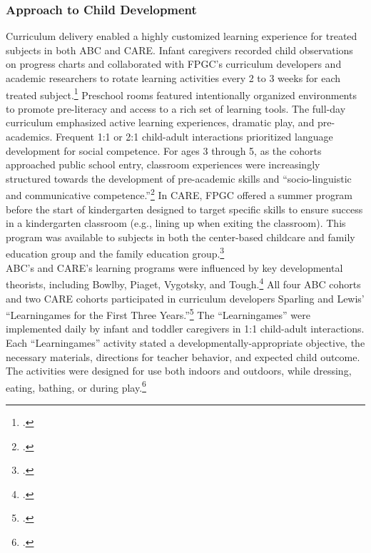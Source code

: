 \begin{appendices}
\subsubsection{Approach to Child Development}
\noindent Curriculum delivery enabled a highly customized learning experience for treated subjects in both ABC and CARE. Infant caregivers recorded child observations on progress charts and collaborated with FPGC's curriculum developers and academic researchers to rotate learning activities every 2 to 3 weeks for each treated subject.\footnote{\citet{Ramey_Collier_etal_1976_CarolinaAbecedarianProject,Campbell_Ramey_1994_CD}.} Preschool rooms featured intentionally organized environments to promote pre-literacy and access to a rich set of learning tools. The full-day curriculum emphasized active learning experiences, dramatic play, and pre-academics. Frequent 1:1 or 2:1 child-adult interactions prioritized language development for social competence. For ages 3 through 5, as the cohorts approached public school entry, classroom experiences were increasingly structured  towards the development of pre-academic skills and ``socio-linguistic and communicative competence.''\footnote{\citet{Ramey-et-al_1977_Intro-to-ABC, Haskins_1985_CD, Ramey_1981_Modification, Ramey_Campbell_1979_SR, Ramey_Smith_1977_AJMD, Ramey_McGinness_etal_1982_Abecedarianapproach, Sparling_Lewis_1979_BOOKLearninggamesFirstThree,Sparling_Lewis_1984_BOOKLearningGamesThreesFours}.} In CARE, FPGC offered a summer program before the start of kindergarten designed to target specific skills to ensure success in a kindergarten classroom (e.g., lining up when exiting the classroom). This program was available to subjects in both the center-based childcare and family education group and the family education group.\footnote{\citet{Ramey_etal_1985_Project-CARE_TiECSE}.} \\

\noindent ABC's and CARE's learning programs were influenced by key developmental theorists, including Bowlby, Piaget, Vygotsky, and Tough.\footnote{\citet{Sparling_1974_Synth_Edu_Infant_SPEECH,Mcginness_1981_Developing,abc2014-2015interviews}.} All four ABC cohorts and two CARE cohorts participated in curriculum developers Sparling and Lewis' ``Learningames for the First Three Years.''\footnote{ \citet{Sparling_Lewis_1979_BOOKLearninggamesFirstThree}.} The ``Learningames'' were implemented daily by infant and toddler caregivers in 1:1 child-adult interactions. Each ``Learningames'' activity stated a developmentally-appropriate objective, the necessary materials, directions for teacher behavior, and expected child outcome. The activities were designed for use both indoors and outdoors, while dressing, eating, bathing, or during play.\footnote{\citet{Ramey_Campbell_1979_SR, Ramey_1981_Modification,Sparling_Lewis_1979_BOOKLearninggamesFirstThree}.}\\


\end{appendices}
